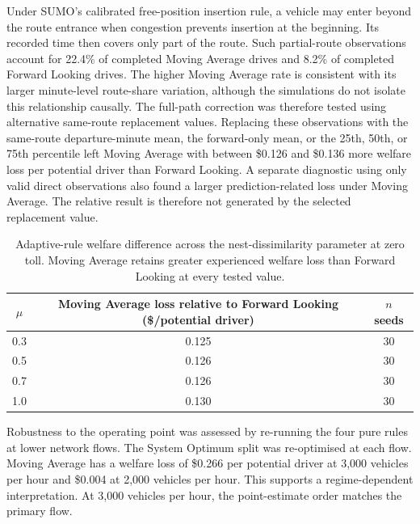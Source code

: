 \documentclass{article}
\begin{document}
Under SUMO's calibrated free-position insertion rule, a vehicle may enter beyond the route entrance when congestion prevents insertion at the beginning. Its recorded time then covers only part of the route. Such partial-route observations account for 22.4\% of completed Moving Average drives and 8.2\% of completed Forward Looking drives. The higher Moving Average rate is consistent with its larger minute-level route-share variation, although the simulations do not isolate this relationship causally. The full-path correction was therefore tested using alternative same-route replacement values. Replacing these observations with the same-route departure-minute mean, the forward-only mean, or the 25th, 50th, or 75th percentile left Moving Average with between \$0.126 and \$0.136 more welfare loss per potential driver than Forward Looking. A separate diagnostic using only valid direct observations also found a larger prediction-related loss under Moving Average. The relative result is therefore not generated by the selected replacement value.

\begin{table}[htbp]
\centering
\small
\setlength{\tabcolsep}{5pt}
\begin{tabular}{ccc}
\toprule
$\mu$ & \shortstack{Moving Average loss relative to\\Forward Looking (\$/potential driver)} & \shortstack{$n$\\seeds} \\
\midrule
0.3 & 0.125 & 30 \\
0.5 & 0.126 & 30 \\
0.7 & 0.126 & 30 \\
1.0 & 0.130 & 30 \\
\bottomrule
\end{tabular}
\caption{Adaptive-rule welfare difference across the nest-dissimilarity parameter at zero toll. Moving Average retains greater experienced welfare loss than Forward Looking at every tested value.}
\label{tab:mu-sensitivity}
\end{table}

Robustness to the operating point was assessed by re-running the four pure rules at lower network flows. The System Optimum split was re-optimised at each flow. Moving Average has a welfare loss of \$0.266 per potential driver at 3,000 vehicles per hour and \$0.004 at 2,000 vehicles per hour. This supports a regime-dependent interpretation. At 3,000 vehicles per hour, the point-estimate order matches the primary flow.
\end{document}
